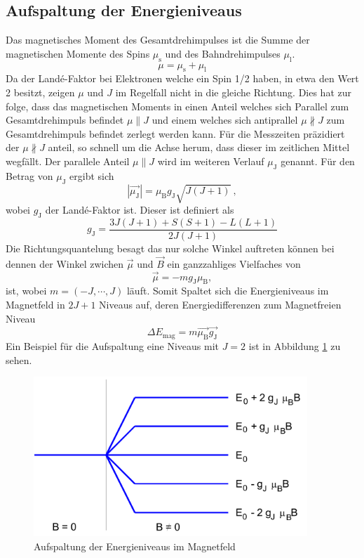 \subsection{Aufspaltung der Energieniveaus}
Das magnetisches Moment des Gesamtdrehimpulses ist die Summe der magnetischen Momente des Spins $\mu_\text{s}$ und des Bahndrehimpulses $\mu_\text{l}$.
\begin{equation}
  \mu = \mu_\text{s} + \mu_\text{l}
\end{equation}
Da der Landé-Faktor bei Elektronen welche ein Spin 1/2 haben, in etwa den Wert 2 besitzt, zeigen $\mu$ und $J$ im Regelfall nicht in die gleiche Richtung. Dies hat zur folge, dass das magnetischen Moments in einen Anteil welches sich Parallel zum Gesamtdrehimpuls befindet $\mu \parallel J$ und einem welches sich antiprallel $\mu \nparallel J$ zum Gesamtdrehimpuls befindet zerlegt werden kann. Für die Messzeiten präzidiert der  $\mu \nparallel J$ anteil, so schnell um die Achse herum, dass dieser im zeitlichen Mittel wegfällt. Der parallele Anteil $\mu \parallel J$ wird im weiteren Verlauf $\mu_\text{J}$ genannt. Für den Betrag von $\mu_\text{J}$ ergibt sich
\begin{equation}
  |\vec{\mu_\text{J}}| = \mu_\text{B} g_\text{J} \sqrt{J(J+1)} \ ,
  \label{eqn:muJ}
\end{equation}
wobei $g_\text{J}$ der Landé-Faktor ist. Dieser ist definiert als
\begin{equation}
  g_\text{J} = \frac{3J(J+1) + S(S+1) -L(L+1)}{2J(J+1)}
  \label{eqn:Lan}
\end{equation}
Die Richtungsquantelung besagt das nur solche Winkel auftreten können bei dennen der Winkel zwichen $\vec{\mu}$ und $\vec{B}$ ein ganzzahliges Vielfaches von
\begin{equation}
\vec{\mu} = -m g_\text{J} \mu_\text{B},
  \label{eqn:mu}
\end{equation}
ist, wobei  $m  = (-J, \cdots, J)$ läuft. Somit Spaltet sich die Energieniveaus im Magnetfeld in $2J+1$ Niveaus auf, deren Energiedifferenzen zum Magnetfreien Niveau
\begin{equation}
	\Delta E_\text{mag} = m \vec{\mu_\text{B}} \vec{g_\text{J}}
  \label{eqn:delE}
\end{equation}
Ein Beispiel für die Aufspaltung eine Niveaus mit $J=2$ ist in Abbildung \ref{fig:Eniv} zu sehen.
\begin{figure}
  \centering
  \includegraphics[height=6cm]{./Bilder/ENiveaus.png}
  \caption{Aufspaltung der Energieniveaus im Magnetfeld \cite{V27}}
   \label{fig:Eniv}
\end{figure}

